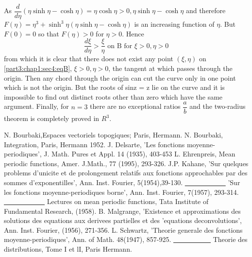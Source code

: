  As $\dfrac{d}{d \eta}(\eta \sinh \eta - \cosh \eta) = \eta \cosh \eta
 > 0,  \eta \sinh \eta - \cosh \eta $ and therefore $F(\eta)= \eta^3 +
 \sinh^3 \eta ( \eta \sinh \eta - \cosh \eta)$ is an increasing\pageoriginale
 function of $\eta$.  But $F(0)=0$ so that $F (\eta) > 0$ for $\eta >
 0$. Hence  
$$
\frac{d \xi}{d \eta} > \frac{\xi}{\eta} \text{ on B for } \xi > 0, \eta > 0
$$
from which it is clear that there does not exist any point $(\xi,
\eta)$ on \ref{part3:chap1:sec4:eqB}, $\xi > 0, \eta > 0$, the tangent at which passes through
the  origin. Then any chord through the origin can cut the curve only
in one point which is not the origin. But the roots of sinz = z lie on
the curve and it is impossible to find out distinct roots other than
zero which have the same argument. Finally, for $n=3$ there are no
exceptional ratios $\dfrac{a}{b}$ and the two-radius theorem is
completely proved in $R^3$.  

\begin{thebibliography}{11}
 {N. Bourbaki},\pageoriginale Espaces vectoriels
  topogiques; Paris, Hermann. 
 {N. Bourbaki}, Integration, Paris, Hermann 1952.
 {J. Delsarte}, 'Les fonctions moyenne-periodiques',
  J. Math. Pures et Appl. 14 (1935), 403-453 
 {L. Ehrenpreis}, Mean periodic functions, Amer. J.Math.,
  77 (1995), 293-326. 
 {J.P. Kahane}, 'Sur quelques problems d'unicite et de
  prolongement relatifs aux fonctions approchables par des sommes
  d'exponentilles', Ann. Inst. Fourier, 5(1954),39-130. 
 {\underline{~~~~~~~~~~~~}} 'Sur les fonctions
  moyenne-periodiques borne', Ann. Inst. Fourier, 7(1957), 293-314. 
 {\underline{~~~~~~~~~~~~}} Lectures on mean periodic
  functions, Tata Institute of Fundamental Research, (1958). 
  {B. Malgrange}, 'Existence et approximations des
  solutions des equations aux derivees partielles et des 'equations
  deconvolutions', Ann. Inst. Fourier, (1956), 271-356. 
 {L. Schwartz}, 'Theorie generale des fonctions
  moyenne-periodiques', Ann. of Math. 48(1947), 857-925. 
 {\underline{~~~~~~~~~~~}} Theorie des distributions,
  Tome I et lI, Paris Hermann. 
\end{thebibliography}
